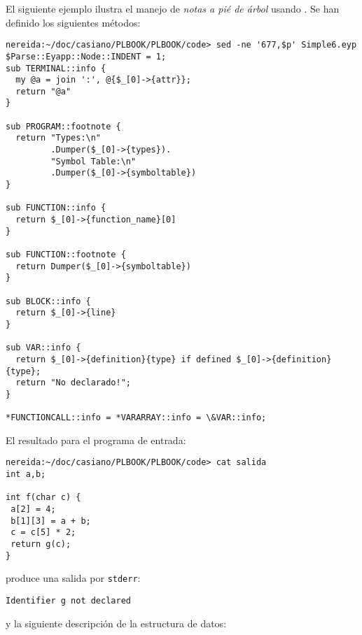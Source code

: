 
El siguiente ejemplo ilustra el manejo de \emph{notas a pié de árbol}
usando . Se han definido los siguientes métodos:
\begin{verbatim}
nereida:~/doc/casiano/PLBOOK/PLBOOK/code> sed -ne '677,$p' Simple6.eyp
$Parse::Eyapp::Node::INDENT = 1;
sub TERMINAL::info {
  my @a = join ':', @{$_[0]->{attr}};
  return "@a"
}

sub PROGRAM::footnote {
  return "Types:\n"
         .Dumper($_[0]->{types}).
         "Symbol Table:\n"
         .Dumper($_[0]->{symboltable})
}

sub FUNCTION::info {
  return $_[0]->{function_name}[0]
}

sub FUNCTION::footnote {
  return Dumper($_[0]->{symboltable})
}

sub BLOCK::info {
  return $_[0]->{line}
}

sub VAR::info {
  return $_[0]->{definition}{type} if defined $_[0]->{definition}{type};
  return "No declarado!";
}

*FUNCTIONCALL::info = *VARARRAY::info = \&VAR::info;
\end{verbatim}
El resultado para el programa de entrada:
\begin{verbatim}
nereida:~/doc/casiano/PLBOOK/PLBOOK/code> cat salida
int a,b;

int f(char c) {
 a[2] = 4;
 b[1][3] = a + b;
 c = c[5] * 2;
 return g(c);
}
\end{verbatim}
produce una salida por \verb|stderr|:
\begin{verbatim}
Identifier g not declared
\end{verbatim}
y la siguiente descripción de la estructura de datos:
